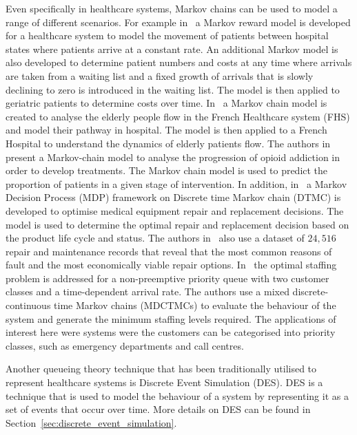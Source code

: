 Even specifically in healthcare systems, Markov chains can be used to model a
range of different scenarios.
For example in~\cite{McClean2006256} a Markov reward model is developed for a
healthcare system to model the movement of patients between hospital states
where patients arrive at a constant rate.
An additional Markov model is also developed to determine patient numbers and
costs at any time where arrivals are taken from a waiting list and a fixed
growth of arrivals that is slowly declining to zero is introduced in the
waiting list.
The model is then applied to geriatric patients to determine costs over time.
In~\cite{Hamdani2015} a Markov chain model is created to analyse the elderly
people flow in the French Healthcare system (FHS) and model their pathway in
hospital.
The model is then applied to a French Hospital to understand the dynamics of
elderly patients flow.
The authors in~\cite{Gosavi2020399} present a Markov-chain model to analyse
the progression of opioid addiction in order to develop treatments.
The Markov chain model is used to predict the proportion of patients in a
given stage of intervention.
In addition, in~\cite{Liao2021} a Markov Decision Process (MDP) framework on
Discrete time Markov chain (DTMC) is developed to optimise medical equipment
repair and replacement decisions.
The model is used to determine the optimal repair and replacement decision
based on the product life cycle and status.
The authors in~\cite{Liao2021} also use a dataset of \(24,516\) repair and
maintenance records that reveal that the most common reasons of fault and the
most economically viable repair options.
In~\cite{vile2017queueing} the optimal staffing problem is addressed for a
non-preemptive priority queue with two customer classes and a time-dependent
arrival rate.
The authors use a mixed discrete-continuous time Markov chains (MDCTMCs) to
evaluate the behaviour of the system and generate the minimum staffing levels
required.
The applications of interest here were systems were the customers can be
categorised into priority classes, such as emergency departments and call
centres.


Another queueing theory technique that has been traditionally utilised to
represent healthcare systems is Discrete Event Simulation (DES).
DES is a technique that is used to model the behaviour of a system by
representing it as a set of events that occur over time.
More details on DES can be found in Section~\ref{sec:discrete_event_simulation}.

